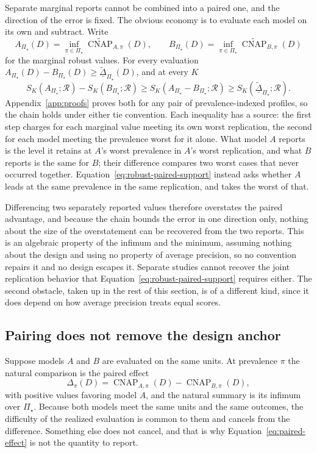 \documentclass[11pt]{article}
\newcommand{\CNAP}{\operatorname{CNAP}}
\newcommand{\Regime}{\mathcal{R}}
\newcommand{\PSet}{\Pi_\star}
\newcommand{\CNAPta}{\widetilde{\CNAP}}
\newcommand{\RobDta}{\underline{\widetilde{\Delta}}_{\PSet}}
\theoremstyle{remark}
\begin{document}
Separate marginal reports cannot be combined into a paired one, and the direction of the error is fixed. The obvious economy is to evaluate each model on its own and subtract. Write
\[
A_{\PSet}(D)
=
\inf_{\pi\in\PSet}\CNAPta_{A,\pi}(D),
\qquad
B_{\PSet}(D)
=
\inf_{\pi\in\PSet}\CNAPta_{B,\pi}(D)
\]
for the marginal robust values. For every evaluation $A_{\PSet}(D)-B_{\PSet}(D)\geq\RobDta(D)$, and at every $K$
\begin{equation}
S_K(A_{\PSet};\Regime)
-
S_K(B_{\PSet};\Regime)
\geq
S_K(A_{\PSet}-B_{\PSet};\Regime)
\geq
S_K(\RobDta;\Regime).
\label{eq:robust-marginal-order}
\end{equation}
Appendix~\ref{app:proofs} proves both for any pair of prevalence-indexed profiles, so the chain holds under either tie convention. Each inequality has a source: the first step charges for each marginal value meeting its own worst replication, the second for each model meeting the prevalence worst for it alone. What model $A$ reports is the level it retains at $A$'s worst prevalence in $A$'s worst replication, and what $B$ reports is the same for $B$; their difference compares two worst cases that never occurred together. Equation~\eqref{eq:robust-paired-support} instead asks whether $A$ leads at the same prevalence in the same replication, and takes the worst of that.

Differencing two separately reported values therefore overstates the paired advantage, and because the chain bounds the error in one direction only, nothing about the size of the overstatement can be recovered from the two reports. This is an algebraic property of the infimum and the minimum, assuming nothing about the design and using no property of average precision, so no convention repairs it and no design escapes it. Separate studies cannot recover the joint replication behavior that Equation~\eqref{eq:robust-paired-support} requires either. The second obstacle, taken up in the rest of this section, is of a different kind, since it does depend on how average precision treats equal scores.

\subsection{Pairing does not remove the design anchor}
\label{sec:paired-anchor}

Suppose models $A$ and $B$ are evaluated on the same units. At prevalence $\pi$ the natural comparison is the paired effect
\begin{equation}
\Delta_\pi(D)
=
\CNAP_{A,\pi}(D)
-
\CNAP_{B,\pi}(D),
\label{eq:paired-effect}
\end{equation}
with positive values favoring model $A$, and the natural summary is its infimum over $\PSet$. Because both models meet the same units and the same outcomes, the difficulty of the realized evaluation is common to them and cancels from the difference. Something else does not cancel, and that is why Equation~\eqref{eq:paired-effect} is not the quantity to report.
\end{document}
